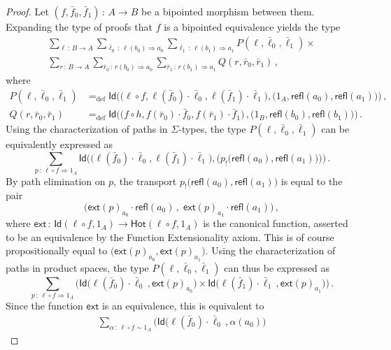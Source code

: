 \documentclass[10pt,a4paper,oneside,reqno]{amsart}
\theoremstyle{mythm}
\theoremstyle{mydef}
\theoremstyle{myrmk}
\newcommand{\defeq}{=_{\mathrm{def}}}
\newcommand{\co}{\,{:}\,}
\newcommand{\com}{\circ}
\newcommand{\ct}{\cdot}
\newcommand{\Hot}{\mathsf{Hot}}
\newcommand{\ext}{\mathsf{ext}}
\newcommand{\Id}{\mathsf{Id}}
\newcommand{\refl}{\mathsf{refl}}
\begin{document}
\begin{proof}
Let  $(f, \bar{f}_0, \bar{f}_1) \co A \to B$ be a bipointed morphism between them. Expanding the type of 
proofs that $f$ is a bipointed equivalence yields the type
\begin{multline*} 
\textstyle
 \sum_{\ell \co B \to  A}  
 \sum_{\bar{\ell}_0 \co \ell(b_0) \Rightarrow a_0} 
 \sum_{\bar{\ell}_1 \co \ell(b_1) \Rightarrow a_1} 
 P(\ell,\bar{\ell}_0,\bar{\ell}_1) \times \\
 \textstyle
 \sum_{r \co B \to A} 
 \sum_{\bar{r}_0 \co r(b_0) \Rightarrow a_0} 
 \sum_{\bar{r}_1 \co  r(b_1) \Rightarrow a_1} 
 Q(r,\bar{r}_0,\bar{r}_1)   \, ,
\end{multline*}
where
\begin{align*}
P(\ell,\bar{\ell}_0,\bar{\ell}_1) & \defeq \Id \Big( \big( \ell \com f, \ell(\bar{f}_0) \ct \bar{\ell}_0, \ell(\bar{f}_1) \ct \bar{\ell}_1\big), \big( 1_A, \refl(a_0), \refl(a_1) \big) \Big)  \, , \\
Q(r,\bar{r}_0,\bar{r}_1) & \defeq \Id \Big( \big( f \com h,   f(\bar{r}_0) \ct \bar{f}_0, f(\bar{r}_1) \ct \bar{f}_1  \big) \, , \big( 1_B, \refl(b_0), \refl(b_1) \big) \Big) \, .
\end{align*}
Using the characterization of paths in $\Sigma$-types, the type $P(\ell,\bar{\ell}_0,\bar{\ell}_1)$ can be equivalently expressed as
\[
\sum_{p \co \ell \com f \Rightarrow 1_A}  
\Id \Big(  \big( \ell (\bar{f}_0) \ct \bar{\ell }_0, \ell (\bar{f}_1) \ct \bar{\ell }_1\big), \big( p_{!}\big(\refl(a_0), \refl(a_1) \big) \big) \Big) \, .
\]
By path elimination on $p$, the transport $p_{!}\big(\refl(a_0), \refl(a_1) \big)$ is equal to the pair 
\[
\big(  \ext(p)_{a_0} \ct \refl(a_0) \, , \;  \ext(p)_{a_1} \ct \refl(a_1) \big) \, ,
\]
where $\ext \co \Id(\ell \com f, 1_A) \to \Hot(\ell \com f,  1_A)$ is the canonical function, asserted to be an equivalence by the Function Extensionality axiom. This is of course propositionally equal to $\big(\ext(p)_{a_0}, \ext(p)_{a_1} \big)$. Using the characterization of paths in product spaces, the type $P(\ell,\bar{\ell}_0,\bar{\ell}_1)$ can thus be expressed as
\[
\sum_{ p \co \ell \com f \Rightarrow 1_A} \Big(
\Id  \big( \ell (\bar{f}_0) \ct \bar{\ell}_0 \, ,  \ext(p)_{a_0} \big) 
\times 
\Id \big( \ell(\bar{f}_1) \ct \bar{\ell}_1 \, ,  \ext(p)_{a_1} \big)
\Big) \, .
\]
Since the function $\ext$ is an equivalence, this is equivalent to
\begin{align*}
\sum_{\alpha \co \ell \com f \sim 1_A} 
\Big( \Id  \big( \ell (\bar{f}_0) \ct \bar{\ell}_0 \, ,  \alpha(a_0) \big) 

\end{align*}
\end{proof}
\end{document}
